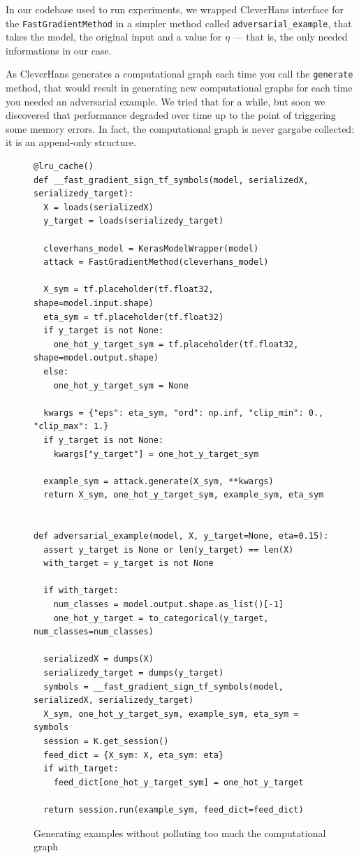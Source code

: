 In our codebase used to run experiments, we wrapped CleverHans
interface for the \texttt{FastGradientMethod} in a simpler method
called \texttt{adversarial\_example}, that takes the model, the
original input and a value for $\eta$ --- that is, the only needed
informations in our case.

As CleverHans generates a computational graph each time you call the
\texttt{generate} method, that would result in generating new
computational graphs for each time you needed an adversarial example.
We tried that for a while, but soon we discovered that performance
degraded over time up to the point of triggering some memory errors. In
fact, the computational graph is never gargabe collected: it is an
append-only structure.

\begin{figure}
  \begin{verbatim}
@lru_cache()
def __fast_gradient_sign_tf_symbols(model, serializedX, serializedy_target):
  X = loads(serializedX)
  y_target = loads(serializedy_target)

  cleverhans_model = KerasModelWrapper(model)
  attack = FastGradientMethod(cleverhans_model)

  X_sym = tf.placeholder(tf.float32, shape=model.input.shape)
  eta_sym = tf.placeholder(tf.float32)
  if y_target is not None:
    one_hot_y_target_sym = tf.placeholder(tf.float32, shape=model.output.shape)
  else:
    one_hot_y_target_sym = None

  kwargs = {"eps": eta_sym, "ord": np.inf, "clip_min": 0., "clip_max": 1.}
  if y_target is not None:
    kwargs["y_target"] = one_hot_y_target_sym

  example_sym = attack.generate(X_sym, **kwargs)
  return X_sym, one_hot_y_target_sym, example_sym, eta_sym


def adversarial_example(model, X, y_target=None, eta=0.15):
  assert y_target is None or len(y_target) == len(X)
  with_target = y_target is not None

  if with_target:
    num_classes = model.output.shape.as_list()[-1]
    one_hot_y_target = to_categorical(y_target, num_classes=num_classes)

  serializedX = dumps(X)
  serializedy_target = dumps(y_target)
  symbols = __fast_gradient_sign_tf_symbols(model, serializedX, serializedy_target)
  X_sym, one_hot_y_target_sym, example_sym, eta_sym = symbols
  session = K.get_session()
  feed_dict = {X_sym: X, eta_sym: eta}
  if with_target:
    feed_dict[one_hot_y_target_sym] = one_hot_y_target

  return session.run(example_sym, feed_dict=feed_dict)
  \end{verbatim}
  \caption{Generating examples without polluting too much the computational graph}
  \label{fig:lru-cache}
\end{figure}

